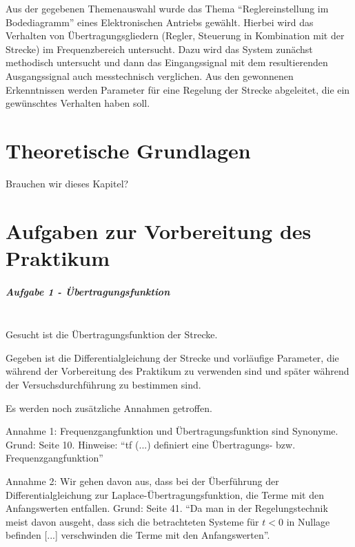 \documentclass[            %
draft = false,             		%
paper = A4,                		%
pagesize = pdftex,         		%
fontsize = 10pt,           		%
DIV=15,                    		%
twoside = false,           		%
twocolumn = false,         		%
parskip = full,           		%
chapterprefix = false,      		%
appendixprefix = true,     		%
headinclude = false,       		%
footinclude = false,       		%
mpinclude = false,         		%
numbers = auto,            		%
cleardoublepage = plain,   		%
footnotes = multiple,      		%
titlepage = true,          		%
headings = normal,         		%
open = right,              		%
bibliography = openstyle,  		%
listof = chaptergapline,   		%
overfullrule = true,
]{scrbook}
\begin{document}
Aus der gegebenen Themenauswahl wurde das Thema ``Reglereinstellung im Bodediagramm'' eines Elektronischen Antriebs gewählt. 
Hierbei wird das Verhalten von Übertragungsgliedern (Regler, Steuerung in Kombination mit der Strecke) im Frequenzbereich untersucht.
Dazu wird das System zunächst methodisch untersucht und dann das Eingangssignal mit dem resultierenden Ausgangssignal auch messtechnisch verglichen.
Aus den gewonnenen Erkenntnissen werden Parameter für eine Regelung der Strecke abgeleitet, die ein gewünschtes Verhalten haben soll.


\newpage
{\let\clearpage\relax \chapter{Theoretische Grundlagen}} \label{chpt:Theory}

Brauchen wir dieses Kapitel?







{\let\clearpage\relax \chapter{Aufgaben zur Vorbereitung des Praktikum}} \label{chpt:Experiments}


\paragraph{Aufgabe 1 - Übertragungsfunktion}~\\

Gesucht ist die Übertragungsfunktion der Strecke.

Gegeben ist die Differentialgleichung der Strecke und vorläufige Parameter, die während der Vorbereitung des Praktikum zu verwenden sind und
später während der Versuchsdurchführung zu bestimmen sind.

Es werden noch zusätzliche Annahmen getroffen.

Annahme 1: Frequenzgangfunktion und Übertragungsfunktion sind Synonyme.
Grund: \cite{versuchssanleitung} Seite 10. Hinweise: ``tf (...) definiert eine Übertragungs- bzw. Frequenzgangfunktion''

Annahme 2: Wir gehen davon aus, dass bei der Überführung der Differentialgleichung zur Laplace-Übertragungsfunktion, die Terme mit den Anfangswerten entfallen.
Grund: \cite{Skript_Regelungstechnik} Seite 41. ``Da man in der Regelungstechnik meist davon ausgeht, dass sich die betrachteten Systeme für $t < 0$ 
in Nullage befinden [...] verschwinden die Terme mit den Anfangswerten''.
\end{document}
